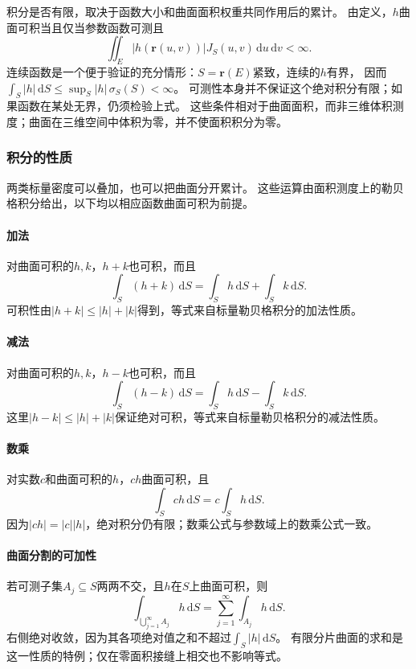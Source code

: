 积分是否有限，取决于函数大小和曲面面积权重共同作用后的累计。
由定义，$h$曲面可积当且仅当参数函数可测且
\[
 \iint_E|h(\bm r(u,v))|J_S(u,v)\,\mathrm du\,\mathrm dv<\infty.
\]
连续函数是一个便于验证的充分情形：$S=\bm r(E)$紧致，连续的$h$有界，
因而$\int_S|h|\,\mathrm dS\leq \sup_S|h|\,\sigma_S(S)<\infty$。
可测性本身并不保证这个绝对积分有限；如果函数在某处无界，仍须检验上式。
这些条件相对于曲面面积，而非三维体积测度；曲面在三维空间中体积为零，并不使面积积分为零。

\subsubsection{积分的性质}

两类标量密度可以叠加，也可以把曲面分开累计。
这些运算由面积测度上的勒贝格积分给出，以下均以相应函数曲面可积为前提。

\paragraph{加法}

对曲面可积的$h,k$，$h+k$也可积，而且
\[
 \int_S(h+k)\,\mathrm dS=\int_Sh\,\mathrm dS+\int_Sk\,\mathrm dS.
\]
可积性由$|h+k|\leq|h|+|k|$得到，等式来自标量勒贝格积分的加法性质。

\paragraph{减法}

对曲面可积的$h,k$，$h-k$也可积，而且
\[
 \int_S(h-k)\,\mathrm dS=\int_Sh\,\mathrm dS-\int_Sk\,\mathrm dS.
\]
这里$|h-k|\leq|h|+|k|$保证绝对可积，等式来自标量勒贝格积分的减法性质。

\paragraph{数乘}

对实数$c$和曲面可积的$h$，$ch$曲面可积，且
\[
 \int_Sch\,\mathrm dS=c\int_Sh\,\mathrm dS.
\]
因为$|ch|=|c||h|$，绝对积分仍有限；数乘公式与参数域上的数乘公式一致。

\paragraph{曲面分割的可加性}

若可测子集$A_j\subseteq S$两两不交，且$h$在$S$上曲面可积，则
\[
 \int_{\bigcup_{j=1}^\infty A_j}h\,\mathrm dS
 =\sum_{j=1}^\infty\int_{A_j}h\,\mathrm dS.
\]
右侧绝对收敛，因为其各项绝对值之和不超过$\int_S|h|\,\mathrm dS$。
有限分片曲面的求和是这一性质的特例；仅在零面积接缝上相交也不影响等式。

